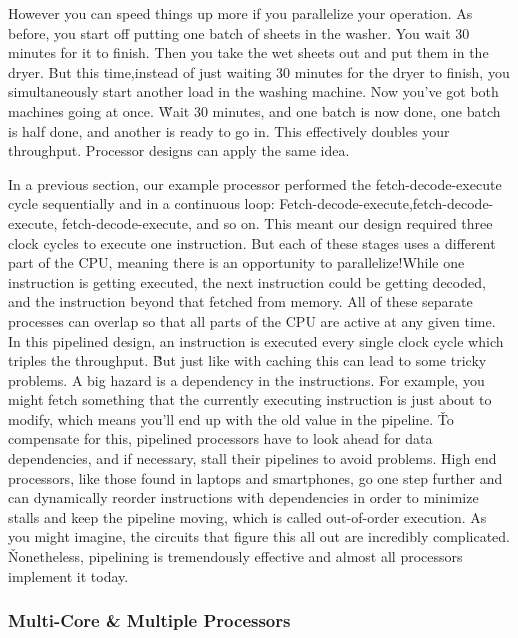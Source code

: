 However you can speed things up more if you parallelize your operation. As before, you start off putting one batch of
sheets in the washer. You wait 30 minutes for it to finish. Then you take the wet sheets out and put them in the
dryer. But this time,instead of just waiting 30 minutes for the dryer to finish, you simultaneously start another
load in the washing machine. Now you've got both machines going at once. \v

Wait 30 minutes, and one batch is now done, one batch is half done, and another is ready to go in. This effectively
doubles your throughput. Processor designs can apply the same idea.
\ee

In a previous section, our example processor performed the fetch-decode-execute cycle sequentially and in a
continuous loop: Fetch-decode-execute,fetch-decode-execute, fetch-decode-execute, and so on. This meant our design
required three clock cycles to execute one instruction. But each of these stages uses a different part of the CPU,
meaning there is an opportunity to parallelize!While one instruction is getting executed,  the next instruction could
be getting decoded, and the instruction beyond that fetched from memory. All of these separate processes can overlap
so that all parts of the CPU are active at any given time. In this pipelined design, an instruction is executed every
single clock cycle which triples the throughput. \v

But just like with caching this can lead to some tricky problems. A big hazard is a dependency in the instructions.
For example, you might fetch something that the currently executing instruction is just about to modify, which means
you'll end up with the old value in the pipeline. \v

To compensate for this, pipelined processors have to look ahead for data dependencies, and if necessary, stall their
pipelines to avoid problems. High end processors, like those found in laptops and smartphones, go one step further
and can dynamically reorder instructions with dependencies in order to minimize stalls and keep the pipeline moving,
which is called out-of-order execution. As you might imagine, the circuits that figure this all out are incredibly
complicated. \v

Nonetheless, pipelining is tremendously effective and almost all processors implement it today.

\subsubsection{Multi-Core \& Multiple Processors}

